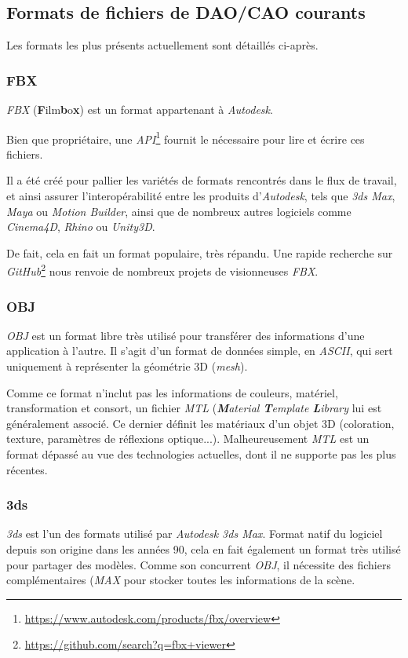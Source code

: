 \subsection{Formats de fichiers de DAO/CAO courants}

Les formats les plus présents actuellement sont détaillés ci-après.

\subsubsection{FBX}
\textit{FBX} (\textbf{F}ilm\textbf{b}o\textbf{x}) est un format appartenant à \textit{Autodesk}.

Bien que propriétaire, une \textit{API}\footnote{\url{https://www.autodesk.com/products/fbx/overview}} fournit le nécessaire pour lire et écrire ces fichiers.

Il a été créé pour pallier les variétés de formats rencontrés dans le flux de travail, et ainsi assurer l'interopérabilité entre les produits d'\textit{Autodesk}, tels que \textit{3ds Max}, \textit{Maya} ou \textit{Motion Builder}, ainsi que de nombreux autres logiciels comme \textit{Cinema4D}, \textit{Rhino} ou \textit{Unity3D}.

De fait, cela en fait un format populaire, très répandu.
Une rapide recherche sur \textit{GitHub}\footnote{\url{https://github.com/search?q=fbx+viewer}} nous renvoie de nombreux projets de visionneuses \textit{FBX}.

\subsubsection{OBJ}
\textit{OBJ} est un format libre très utilisé pour transférer des informations d'une application à l'autre. Il s'agit d'un format de données simple, en \textit{ASCII}, qui sert uniquement à représenter la géométrie 3D (\textit{mesh}).

Comme ce format n'inclut pas les informations de couleurs, matériel, transformation et consort, un fichier \textit{MTL} (\textit{\textbf{M}aterial \textbf{T}emplate \textbf{L}ibrary} lui est généralement associé. Ce dernier définit les matériaux d'un objet 3D (coloration, texture, paramètres de réflexions optique...). Malheureusement \textit{MTL} est un format dépassé au vue des technologies actuelles, dont il ne supporte pas les plus récentes.

\subsubsection{3ds}
\textit{3ds} est l'un des formats utilisé par \textit{Autodesk 3ds Max}. Format natif du logiciel depuis son origine dans les années 90, cela en fait également un format très utilisé pour partager des modèles. Comme son concurrent \textit{OBJ}, il nécessite des fichiers complémentaires (\textit{MAX} pour stocker toutes les informations de la scène.

